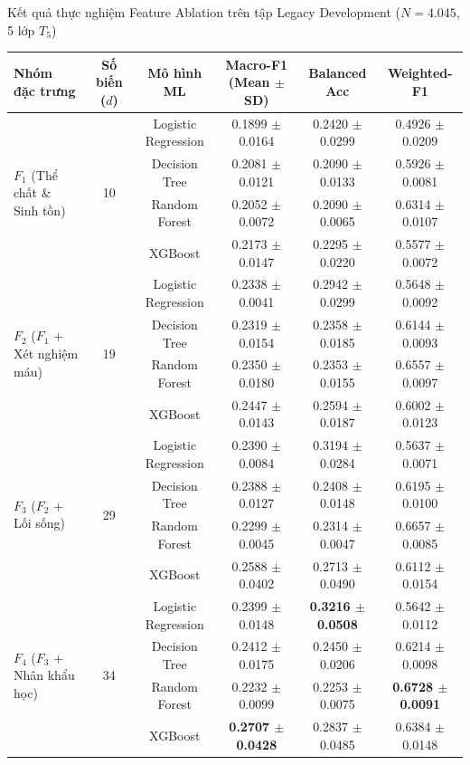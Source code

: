 \begin{table}{Kết quả thực nghiệm Feature Ablation trên tập Legacy Development ($N = 4.045$, 5 lớp $T_5$)}
\centering
\label{tab:ablation-results}
\begin{tabular}{l c c c c c}
\toprule
\textbf{Nhóm đặc trưng} & \textbf{Số biến ($d$)} & \textbf{Mô hình ML} & \textbf{Macro-F1 (Mean $\pm$ SD)} & \textbf{Balanced Acc} & \textbf{Weighted-F1} \\
\midrule
\multirow{4}{*}{\textbf{$F_1$} (Thể chất \& Sinh tồn)} & \multirow{4}{*}{10} 
  & Logistic Regression & 0.1899 $\pm$ 0.0164 & 0.2420 $\pm$ 0.0299 & 0.4926 $\pm$ 0.0209 \\
& & Decision Tree        & 0.2081 $\pm$ 0.0121 & 0.2090 $\pm$ 0.0133 & 0.5926 $\pm$ 0.0081 \\
& & Random Forest       & 0.2052 $\pm$ 0.0072 & 0.2090 $\pm$ 0.0065 & 0.6314 $\pm$ 0.0107 \\
& & XGBoost             & 0.2173 $\pm$ 0.0147 & 0.2295 $\pm$ 0.0220 & 0.5577 $\pm$ 0.0072 \\
\midrule
\multirow{4}{*}{\textbf{$F_2$} ($F_1$ + Xét nghiệm máu)} & \multirow{4}{*}{19} 
  & Logistic Regression & 0.2338 $\pm$ 0.0041 & 0.2942 $\pm$ 0.0299 & 0.5648 $\pm$ 0.0092 \\
& & Decision Tree        & 0.2319 $\pm$ 0.0154 & 0.2358 $\pm$ 0.0185 & 0.6144 $\pm$ 0.0093 \\
& & Random Forest       & 0.2350 $\pm$ 0.0180 & 0.2353 $\pm$ 0.0155 & 0.6557 $\pm$ 0.0097 \\
& & XGBoost             & 0.2447 $\pm$ 0.0143 & 0.2594 $\pm$ 0.0187 & 0.6002 $\pm$ 0.0123 \\
\midrule
\multirow{4}{*}{\textbf{$F_3$} ($F_2$ + Lối sống)} & \multirow{4}{*}{29} 
  & Logistic Regression & 0.2390 $\pm$ 0.0084 & 0.3194 $\pm$ 0.0284 & 0.5637 $\pm$ 0.0071 \\
& & Decision Tree        & 0.2388 $\pm$ 0.0127 & 0.2408 $\pm$ 0.0148 & 0.6195 $\pm$ 0.0100 \\
& & Random Forest       & 0.2299 $\pm$ 0.0045 & 0.2314 $\pm$ 0.0047 & 0.6657 $\pm$ 0.0085 \\
& & XGBoost             & 0.2588 $\pm$ 0.0402 & 0.2713 $\pm$ 0.0490 & 0.6112 $\pm$ 0.0154 \\
\midrule
\multirow{4}{*}{\textbf{$F_4$} ($F_3$ + Nhân khẩu học)} & \multirow{4}{*}{34} 
  & Logistic Regression & 0.2399 $\pm$ 0.0148 & \textbf{0.3216 $\pm$ 0.0508} & 0.5642 $\pm$ 0.0112 \\
& & Decision Tree        & 0.2412 $\pm$ 0.0175 & 0.2450 $\pm$ 0.0206 & 0.6214 $\pm$ 0.0098 \\
& & Random Forest       & 0.2232 $\pm$ 0.0099 & 0.2253 $\pm$ 0.0075 & \textbf{0.6728 $\pm$ 0.0091} \\
& & XGBoost             & \textbf{0.2707 $\pm$ 0.0428} & 0.2837 $\pm$ 0.0485 & 0.6384 $\pm$ 0.0148 \\
\bottomrule
\end{tabular}
\end{table}

